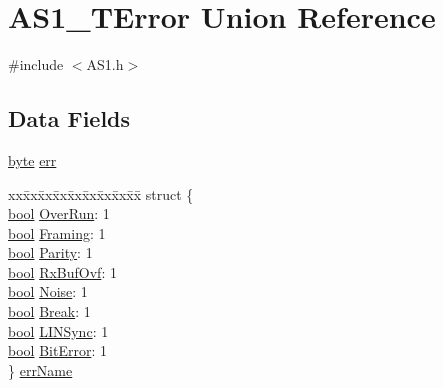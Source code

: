 \hypertarget{union_a_s1___t_error}{}\section{A\+S1\+\_\+\+T\+Error Union Reference}
\label{union_a_s1___t_error}


{\ttfamily \#include $<$A\+S1.\+h$>$}

\subsection*{Data Fields}
\begin{DoxyCompactItemize}
\item 
\hyperlink{group___p_e___types__module_ga0c8186d9b9b7880309c27230bbb5e69d}{byte} \hyperlink{union_a_s1___t_error_a52cc22cfe0b3ac9a8f88848b02f4d47e}{err}
\item 
\begin{tabbing}
xx\=xx\=xx\=xx\=xx\=xx\=xx\=xx\=xx\=\kill
struct \{\\
\>\hyperlink{group___p_e___types__module_ga97a80ca1602ebf2303258971a2c938e2}{bool} \hyperlink{union_a_s1___t_error_ae15421a6d353dfef2478432985ea60f7}{OverRun}: 1\\
\>\hyperlink{group___p_e___types__module_ga97a80ca1602ebf2303258971a2c938e2}{bool} \hyperlink{union_a_s1___t_error_aa416d4710afa5fdf70fc011d118acf1a}{Framing}: 1\\
\>\hyperlink{group___p_e___types__module_ga97a80ca1602ebf2303258971a2c938e2}{bool} \hyperlink{union_a_s1___t_error_a99fd786f4086e50e917c12b226fc82af}{Parity}: 1\\
\>\hyperlink{group___p_e___types__module_ga97a80ca1602ebf2303258971a2c938e2}{bool} \hyperlink{union_a_s1___t_error_aed37d6601dc7121b167ee47354444421}{RxBufOvf}: 1\\
\>\hyperlink{group___p_e___types__module_ga97a80ca1602ebf2303258971a2c938e2}{bool} \hyperlink{union_a_s1___t_error_a14869f07df4b46efad374f848283ab46}{Noise}: 1\\
\>\hyperlink{group___p_e___types__module_ga97a80ca1602ebf2303258971a2c938e2}{bool} \hyperlink{union_a_s1___t_error_ad42e6a21145d660db4b685f64e3f80a5}{Break}: 1\\
\>\hyperlink{group___p_e___types__module_ga97a80ca1602ebf2303258971a2c938e2}{bool} \hyperlink{union_a_s1___t_error_a40a3a1cf9de4ec81818bf122436c44d3}{LINSync}: 1\\
\>\hyperlink{group___p_e___types__module_ga97a80ca1602ebf2303258971a2c938e2}{bool} \hyperlink{union_a_s1___t_error_aea1659529fabba7dea0bd089904f5821}{BitError}: 1\\
\} \hyperlink{union_a_s1___t_error_ac118e5d6b7051a19f02468df60547515}{errName}\\

\end{tabbing}\end{DoxyCompactItemize}


